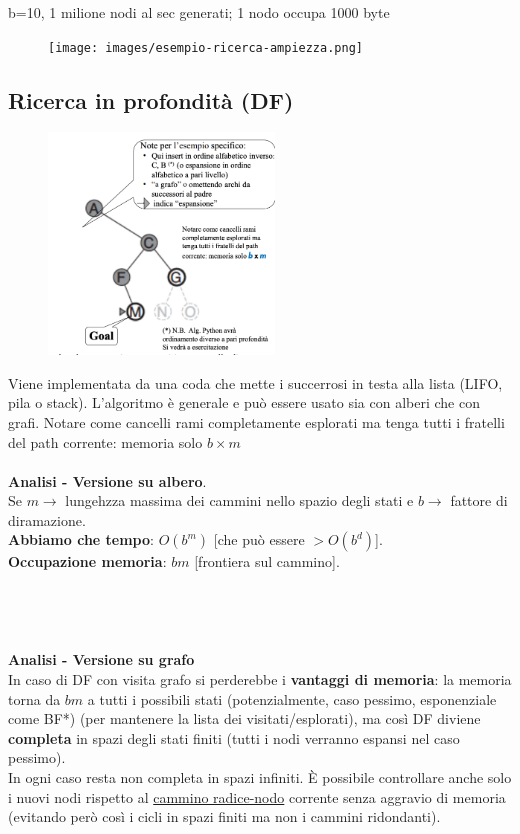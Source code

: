 \begin{example}
	b=10, 1 milione nodi al sec generati; 1 nodo occupa 1000 byte
	\begin{figure}[h!]
		\centering
		\texttt{[image: images/esempio-ricerca-ampiezza.png]}
	\end{figure}
\end{example}

\subsection{Ricerca in profondità (DF)}
\begin{figure}
	\centering
	\includegraphics[width=6cm]{images/ricerca-profondità.png}
\end{figure}
Viene implementata da una coda che mette i succerrosi in testa alla lista (LIFO, pila o stack). L'algoritmo è
generale e può essere usato sia con alberi che con grafi. Notare
come cancelli rami completamente esplorati ma tenga tutti i fratelli del path corrente: memoria solo $b \times m$\\\\
\textbf{Analisi - Versione su albero}.\\
Se $m \to$ lungehzza massima dei cammini nello spazio degli stati e $b \to$ fattore di diramazione.\\
\textbf{Abbiamo che tempo}: $O(b^m)$ [che può essere $> O(b^d)$].\\
\textbf{Occupazione memoria}: $bm$ [frontiera sul cammino].\\\\\\\\\\
\textbf{Analisi - Versione su grafo}\\
In caso di DF con visita grafo si perderebbe i \textbf{vantaggi di memoria}: la memoria torna da
$bm$ a tutti i possibili stati (potenzialmente, caso pessimo, esponenziale come BF*) (per mantenere la lista
dei visitati/esplorati), ma così DF diviene \textbf{completa} in spazi degli stati finiti (tutti 
i nodi verranno espansi nel caso pessimo).\\
In ogni caso resta non completa in spazi infiniti. È possibile controllare anche solo i nuovi nodi 
rispetto al \underline{cammino radice-nodo} corrente senza aggravio di memoria (evitando però così i 
cicli in spazi finiti ma non i cammini ridondanti).

